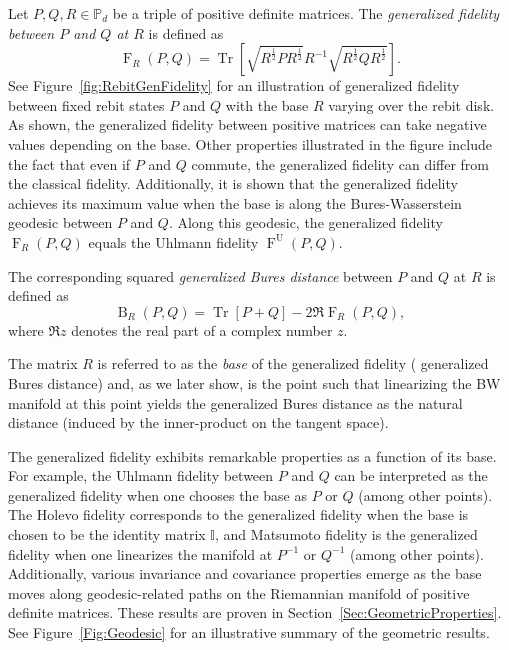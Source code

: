 \documentclass[12pt]{article}
\theoremstyle{definition}
\newcommand{\Fg}[3]{\operatorname{F}_{#3}\!\left(#1, #2\right)}
\newcommand{\Fu}[2]{\operatorname{F}^\mathrm{U}\!\left(#1, #2\right)}
\begin{document}
Let $P,Q,R \in \mathbb P_d$ be a triple of positive definite matrices. The \textit{generalized fidelity between $P$ and $Q$ at $R$} is defined as
\begin{equation}
    \operatorname{F}_R(P,Q) = \operatorname{Tr}\left[\sqrt{ R^{\frac12} P R^{\frac12}} R^{-1}\sqrt{ R^{\frac12} Q R^{\frac12}}  \right]. 
\end{equation}
See Figure~\ref{fig:RebitGenFidelity} for an illustration of generalized fidelity between fixed rebit states $P$ and $Q$ with the base $R$ varying over the rebit disk. As shown, the generalized fidelity between positive matrices can take negative values depending on the base. Other properties illustrated in the figure include the fact that even if $P$ and $Q$ commute, the generalized fidelity can differ from the classical fidelity. Additionally, it is shown that the generalized fidelity achieves its maximum value when the base is along the Bures-Wasserstein geodesic between $P$ and $Q$. Along this geodesic, the generalized fidelity $\Fg{P}{Q}{R}$ equals the Uhlmann fidelity $\Fu{P}{Q}$.

The corresponding squared \textit{generalized Bures distance} between $P$ and $Q$ at $R$ is defined as
\begin{equation}
    \operatorname{B}_R(P,Q) = \operatorname{Tr}[P+Q] - 2 \Re\operatorname{F}_R(P,Q),  
\end{equation}
where $\Re z$ denotes the real part of a complex number $z$. 

The matrix $R$ is referred to as the \textit{base} of the generalized fidelity ( generalized Bures distance) and, as we later show, is the point such that linearizing the BW manifold at this point yields the generalized Bures distance as the natural distance (induced by the inner-product on the tangent space).


The generalized fidelity exhibits remarkable properties as a function of its base. For example, the Uhlmann fidelity between $P$ and $Q$ can be interpreted as the generalized fidelity when one chooses the base as $P$ or $Q$ (among other points). The Holevo fidelity corresponds to the generalized fidelity when the base is chosen to be the identity matrix $\mathbb I$, and Matsumoto fidelity is the generalized fidelity when one linearizes the manifold at $P^{-1}$ or $Q^{-1}$ (among other points). Additionally, various invariance and covariance properties emerge as the base moves along geodesic-related paths on the Riemannian manifold of positive definite matrices. These results are proven in Section~\ref{Sec:GeometricProperties}. See Figure~\ref{Fig:Geodesic} for an illustrative summary of the geometric results.
\end{document}

